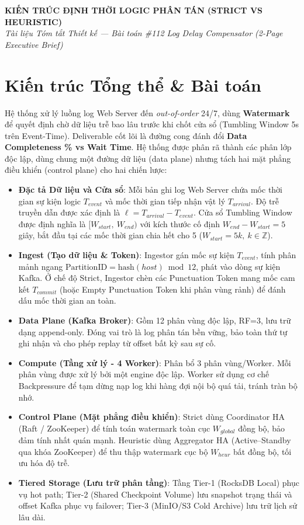 \documentclass[9pt,a4paper]{article}
\begin{document}
\begin{center}
    \large\textbf{KIẾN TRÚC ĐỊNH THỜI LOGIC PHÂN TÁN (STRICT VS HEURISTIC)} \\
    \small\textit{Tài liệu Tóm tắt Thiết kế --- Bài toán \#112 Log Delay Compensator (2-Page Executive Brief)}
\end{center}

\section{Kiến trúc Tổng thể \& Bài toán}
Hệ thống xử lý luồng log Web Server đến \emph{out-of-order} 24/7, dùng \textbf{Watermark} để quyết định chờ dữ liệu trễ bao lâu trước khi chốt cửa sổ (Tumbling Window 5s trên Event-Time). Deliverable cốt lõi là đường cong đánh đổi \textbf{Data Completeness \% vs Wait Time}. Hệ thống được phân rã thành các phân lớp độc lập, dùng chung một đường dữ liệu (data plane) nhưng tách hai mặt phẳng điều khiển (control plane) cho hai chiến lược:

\begin{itemize}[leftmargin=*]
    \item \textbf{Đặc tả Dữ liệu và Cửa sổ}: Mỗi bản ghi log Web Server chứa mốc thời gian sự kiện logic $T_{event}$ và mốc thời gian tiếp nhận vật lý $T_{arrival}$. Độ trễ truyền dẫn được xác định là $\ell = T_{arrival} - T_{event}$. Cửa sổ Tumbling Window được định nghĩa là $[W_{start},\ W_{end})$ với kích thước cố định $W_{end} - W_{start} = 5$ giây, bắt đầu tại các mốc thời gian chia hết cho 5 ($W_{start} = 5k,\ k \in \mathbb{Z}$).
    \item \textbf{Ingest (Tạo dữ liệu \& Token)}: Ingestor gán mốc sự kiện $T_{event}$, tính phân mảnh ngang $\text{PartitionID} = \text{hash}(host) \bmod 12$, phát vào dòng sự kiện Kafka. Ở chế độ Strict, Ingestor chèn các Punctuation Token mang mốc cam kết $T_{commit}$ (hoặc Empty Punctuation Token khi phân vùng rảnh) để đánh dấu mốc thời gian an toàn.
    \item \textbf{Data Plane (Kafka Broker)}: Gồm 12 phân vùng độc lập, RF=3, lưu trữ dạng append-only. Đóng vai trò là log phân tán bền vững, bảo toàn thứ tự ghi nhận và cho phép replay từ offset bất kỳ sau sự cố.
    \item \textbf{Compute (Tầng xử lý - 4 Worker)}: Phân bổ 3 phân vùng/Worker. Mỗi phân vùng được xử lý bởi một engine độc lập. Worker sử dụng cơ chế Backpressure để tạm dừng nạp log khi hàng đợi nội bộ quá tải, tránh tràn bộ nhớ.
    \item \textbf{Control Plane (Mặt phẳng điều khiển)}: Strict dùng Coordinator HA (Raft / ZooKeeper) để tính toán watermark toàn cục $W_{global}$ đồng bộ, bảo đảm tính nhất quán mạnh. Heuristic dùng Aggregator HA (Active--Standby qua khóa ZooKeeper) để thu thập watermark cục bộ $W_{heur}$ bất đồng bộ, tối ưu hóa độ trễ.
    \item \textbf{Tiered Storage (Lưu trữ phân tầng)}: Tầng Tier-1 (RocksDB Local) phục vụ hot path; Tier-2 (Shared Checkpoint Volume) lưu snapshot trạng thái và offset Kafka phục vụ failover; Tier-3 (MinIO/S3 Cold Archive) lưu trữ lịch sử lâu dài.
\end{itemize}
\end{document}
